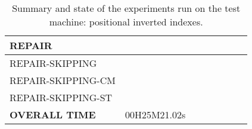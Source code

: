 \begin{table}[htbp]
\begin{tabular}{|l|r|r|c|c|c|c|c|c|}
   REPAIR                    &       &       &       &       &       &       &       &    \\ \hline
   REPAIR-SKIPPING           &       &       &       &       &       &       &       &    \\ \hline
   REPAIR-SKIPPING-CM        &       &       &       &       &       &       &       &    \\ \hline
   REPAIR-SKIPPING-ST        &       &       &       &       &       &       &       &    \\ \hline
   \hline
   \textbf{OVERALL TIME }    &     \multicolumn{2}{|c|}{  00H25M21.02s }   &\multicolumn{6}{|r}{}  \\

\cline{1-3}    
   \end{tabular}%
  \caption{Summary and state of the experiments run on the test machine: positional inverted indexes.}
  \label{tab:addlabel}%
\end{table}%





